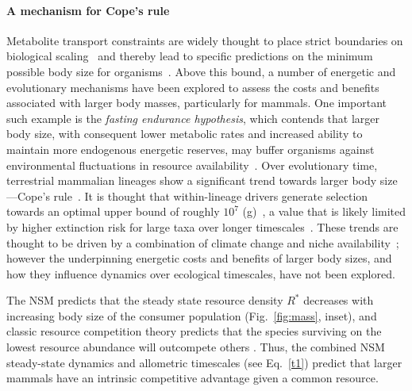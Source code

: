 \documentclass[twocolumn,preprintnumbers,amsmath,amssymb,superscriptaddress]{revtex4}
\begin{document}
\noindent \paragraph*{{\bf A mechanism for Cope's rule}} Metabolite transport
constraints are widely thought to place strict boundaries on biological
scaling~\citep{Brown:1993p708,West:1997cg,Brown:2004wq} and thereby lead to
specific predictions on the minimum possible body size for
organisms~\citep{West:2002ud}.  Above this bound, a number of energetic and
evolutionary mechanisms have been explored to assess the costs and benefits
associated with larger body masses, particularly for mammals.  One important
such example is the \emph{fasting endurance hypothesis}, which contends that
larger body size, with consequent lower metabolic rates and increased ability
to maintain more endogenous energetic reserves, may buffer organisms against
environmental fluctuations in resource availability~\citep{Millar:1990p923}.
Over evolutionary time, terrestrial mammalian lineages show a significant
trend towards larger body size---Cope's
rule~\citep{Alroy:1998p1594,Clauset:2009fh,Smith:2010p3442,Saarinen:2014br}.
It is thought that within-lineage drivers generate selection towards an
optimal upper bound of roughly $10^7$ (g)~\citep{Alroy:1998p1594}, a value
that is likely limited by higher extinction risk for large taxa over longer
timescales~\citep{Clauset:2009fh}.  These trends are thought to be driven by
a combination of climate change and niche
availability~\citep{Saarinen:2014br}; however the underpinning energetic
costs and benefits of larger body sizes, and how they influence dynamics over
ecological timescales, have not been explored.



The NSM predicts that the steady state resource density $R^{*}$ decreases
with increasing body size of the consumer population (Fig.~\ref{fig:mass},
inset), and classic resource competition theory predicts that the species
surviving on the lowest resource abundance will outcompete others
\citep{tilman1981,dutkiewicz2009,barton2010}. Thus, the combined NSM
steady-state dynamics and allometric timescales (see Eq.~\eqref{t1}) predict
that larger mammals have an intrinsic competitive advantage given a common
resource.  
\end{document}
